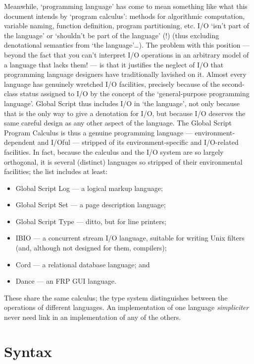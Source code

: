 \documentclass{report}
\begin{document}
Meanwhile, `programming language' has come to mean something like what this document intends by `program calculus':
methods for algorithmic computation, variable naming, function definition, program partitioning, etc.
I/O `isn't part of the language' or `shouldn't be part of the language' (!) (thus excluding denotational semantics from `the language'\ldots).
The problem with this position --- beyond the fact that you can't interpret I/O operations in an arbitrary model of a language that lacks them! ---
is that it justifies the neglect of I/O that programming language designers have traditionally lavished on it.
Almost every language has genuinely wretched I/O facilities,
precisely because of the second-class status assigned to I/O by the concept of the `general-purpose programming language'.
Global Script thus includes I/O in `the language', not only because that is the only way to give a denotation for I/O,
but because I/O deserves the same careful design as any other aspect of the language.
The Global Script Program Calculus is thus a genuine programming language --- environment-dependent and I/Oful ---
stripped of its environment-specific and I/O-related facilities.
In fact, because the calculus and the I/O system are so largely orthogonal, it is several (distinct) languages so stripped of their environmental facilities;
the list includes at least:
\begin{itemize}
    \item Global Script Log --- a logical markup language;
    \item Global Script Set --- a page description language;
    \item Global Script Type --- ditto, but for line printers;
    \item IBIO --- a concurrent stream I/O language, suitable for writing Unix filters (and, although not designed for them, compilers);
    \item Cord --- a relational database language; and
    \item Dance --- an FRP GUI language.
\end{itemize}
These share the same calculus; the type system distinguishes between the operations of different languages.
An implementation of one language \emph{simpliciter} never need link in an implementation of any of the others.

\chapter{Syntax}
\end{document}
